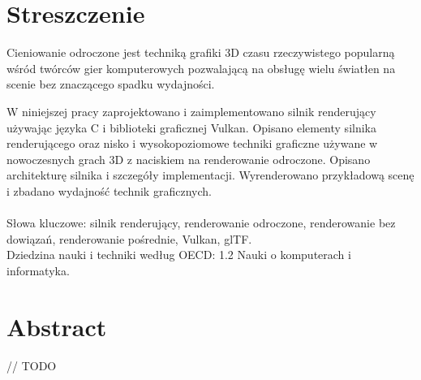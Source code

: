 \chapter*{Streszczenie}
Cieniowanie odroczone jest techniką grafiki 3D czasu rzeczywistego popularną wśród twórców gier komputerowych pozwalającą na obsługę wielu światłen na scenie bez znaczącego spadku wydajności.

W niniejszej pracy zaprojektowano i zaimplementowano silnik renderujący używając języka C i biblioteki graficznej Vulkan.
Opisano elementy silnika renderującego oraz nisko i wysokopoziomowe techniki graficzne używane w nowoczesnych grach 3D z naciskiem na renderowanie odroczone. Opisano architekturę silnika i szczegóły implementacji. Wyrenderowano przykładową scenę i zbadano wydajność technik graficznych.
\\
\\
Słowa kluczowe: silnik renderujący, renderowanie odroczone, renderowanie bez dowiązań, renderowanie pośrednie, Vulkan, glTF.
\\
Dziedzina nauki i techniki według OECD: 1.2 Nauki o komputerach i informatyka.

\chapter*{Abstract}
// TODO